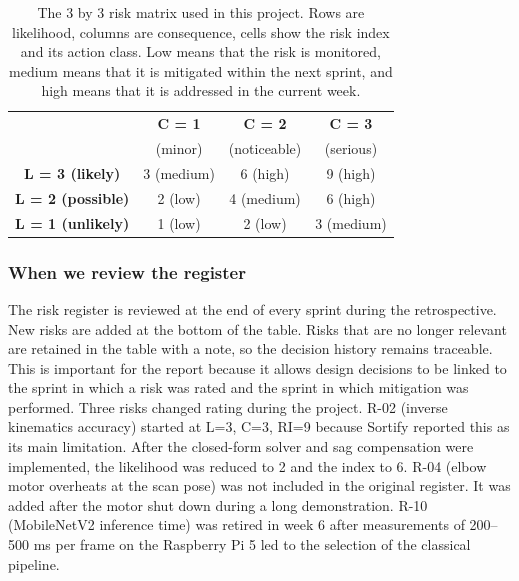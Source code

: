 \begin{table}[h]
\centering
\small
\begin{tabular}{c|ccc}
\toprule
& \textbf{C = 1} & \textbf{C = 2} & \textbf{C = 3} \\
& (minor) & (noticeable) & (serious) \\
\midrule
\textbf{L = 3 (likely)} & 3 (medium) & 6 (high) & 9 (high) \\
\textbf{L = 2 (possible)} & 2 (low) & 4 (medium) & 6 (high) \\
\textbf{L = 1 (unlikely)} & 1 (low) & 2 (low) & 3 (medium) \\
\bottomrule
\end{tabular}
\caption{The 3 by 3 risk matrix used in this project. Rows are
likelihood, columns are consequence, cells show the risk index and its
action class. Low means that the risk is monitored, medium means that it
is mitigated within the next sprint, and high means that it is addressed
in the current week.}
\label{tab:risk-matrix}
\end{table}
\subsubsection*{When we review the register}
The risk register is reviewed at the end of every sprint during the
retrospective. New risks are added at the bottom of the table. Risks
that are no longer relevant are retained in the table with a note, so
the decision history remains traceable. This is important for the report
because it allows design decisions to be linked to the sprint in which a
risk was rated and the sprint in which mitigation was performed.
Three risks changed rating during the project. R-02 (inverse kinematics
accuracy) started at L=3, C=3, RI=9 because Sortify reported this as its
main limitation. After the closed-form solver and sag compensation were
implemented, the likelihood was reduced to 2 and the index to 6. R-04
(elbow motor overheats at the scan pose) was not included in the
original register. It was added after the motor shut down during a long
demonstration. R-10 (MobileNetV2 inference time) was retired in week 6
after measurements of 200--500 ms per frame on the Raspberry Pi 5 led to
the selection of the classical pipeline.


